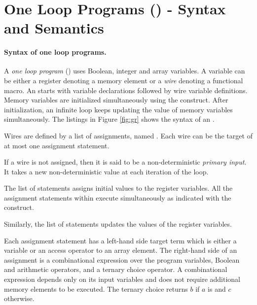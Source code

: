 \section{One Loop Programs (\caig) - Syntax and Semantics}
\label{sec:this}
%
\paragraph{Syntax of one loop programs.}
%
A {\em one loop program} (\caig) uses Boolean, 
integer and array variables. 
A variable can be either a register denoting a memory element or a {\em wire} denoting a functional macro.
An \caig starts with variable declarations followed by wire variable definitions. 
Memory variables are initialized simultaneously using the  construct. 
After initialization, an infinite loop keeps updating the value of memory variables simultaneously. The listings in Figure \ref{fig:gr} shows the syntax of an \caig. 

Wires are defined by a list of assignments, named . 
Each wire can be the target of at most one assignment statement. 

If a wire is not assigned, then it is said to be a non-deterministic {\em primary input}. 
It takes a new non-deterministic value at each iteration of the loop.

The list of statements  assigns initial values to 
the register variables.
All the assignment statements within  execute
simultaneously as indicated with the  construct.

Similarly, the  list of statements updates the values 
of the register variables. 

Each assignment statement has a left-hand side target term 
which is either a variable or an access operator to an 
array element. 
The right-hand side of an assignment is a combinational expression over the program variables,  
Boolean and arithmetic operators, and a ternary choice 
operator. 
A combinational expression depends only on its input variables and does not require additional  memory elements to be executed. 
The ternary choice  returns $b$ if $a$ 
is \true and $c$ otherwise. 

